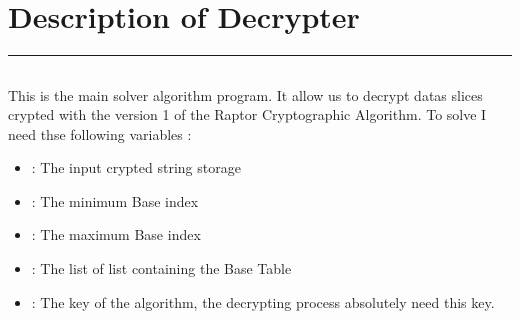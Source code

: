 \documentclass[letterpaper,10pt,english]{sphinxmanual}
\begin{document}
\begin{sphinxVerbatim}[commandchars=\\\{\}]
\end{sphinxVerbatim}

\newpage
\section{Description of De\sphinxhyphen{}crypter}
\label{\detokenize{DescriptionofDecrypterv3.1:description-of-de-crypter}}\label{\detokenize{DescriptionofDecrypterv3.1::doc}}
\sphinxAtStartPar
{}


\bigskip\hrule\bigskip



\subsection{}
\label{\detokenize{DescriptionofDecrypterv3.1:algorithm}}
\sphinxAtStartPar
{}

\sphinxAtStartPar
This is the main solver algorithm program.
It allow us to decrypt datas slices crypted with the version 1 of the Raptor Cryptographic Algorithm.
To solve I need thse following variables :
\begin{itemize}
\item {} 
\sphinxAtStartPar
{} : The input crypted string storage

\item {} 
\sphinxAtStartPar
{} : The minimum Base index

\item {} 
\sphinxAtStartPar
{} : The maximum Base index

\item {} 
\sphinxAtStartPar
{} : The list of list containing the Base Table

\item {} 
\sphinxAtStartPar
{} : The key of the algorithm, the decrypting process absolutely need this key.

\end{itemize}
\end{document}
